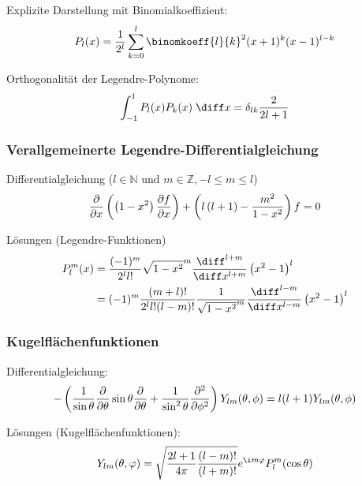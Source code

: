 \documentclass[11pt]{article}
\numberwithin{equation}{section}
\begin{document}
				\noindent
				Explizite Darstellung mit Binomialkoeffizient:
				\begin{equation}
					P_l(x)=\frac{1}{2^l} \sum_{k=0}^{l}\binomkoeff{l}{k}^2(x+1)^k(x-1)^{l-k}
				\end{equation}

				\noindent
				Orthogonalität der Legendre-Polynome:
				\begin{equation}
					\int_{-1}^1 P_l(x) P_k(x)\;\diff x = \delta_{lk} \frac{2}{2l+1}
				\end{equation}

			\subsubsection{Verallgemeinerte Legendre-Differentialgleichung}
				\noindent
				Differentialgleichung ($l\in\mathbb{N}$ und $m\in\mathbb{Z}, -l\le m\le l$)
				\begin{equation}
					\frac{\partial }{\partial x}\left(\left(1-x^2\right)\frac{\partial f}{\partial x}\right)+\left(l\left(l+1\right)-\frac{m^2}{1-x^2}\right)f= 0
				\end{equation}

				\noindent
				Lösungen (Legendre-Funktionen)
				\begin{equation}
					\begin{aligned}
						P_l^m(x) &= \frac{(-1)^m}{2^l l!}\sqrt{1-x^2}^m
						\frac{\diff^{l+m}}{\diff x^{l+m}}\left(x^2-1\right)^l \\
						&= (-1)^m \frac{(m+l)!}{2^l l! (l-m)!}\frac{1}{\sqrt{1-x^2}^m}
						\frac{\diff^{l-m}}{\diff x^{l-m}}\left(x^2-1\right)^l \\
					\end{aligned}
				\end{equation}

			\subsubsection{Kugelflächenfunktionen}
				\noindent
				Differentialgleichung:
				\begin{equation}
					-\left(
					\frac{1}{\sin\theta}\frac{\partial }{\partial \theta}\sin\theta\frac{\partial }{\partial \theta} + \frac{1}{\sin^2\theta}\frac{\partial^2}{\partial \phi^2}
					\right)
					Y_{lm}(\theta,\phi) = l(l+1)Y_{lm}(\theta,\phi)
				\end{equation}

				\noindent
				Lösungen (Kugelflächenfunktionen):
				\begin{equation} \label{eq:kugelflächenfunktionen}
					Y_{lm}(\theta,\varphi) = \sqrt{\frac{2l+1}{4\pi}\frac{(l-m)!}{(l+m)!}} e^{\i m\varphi} P_l^m(\cos\theta)
				\end{equation}
\end{document}
